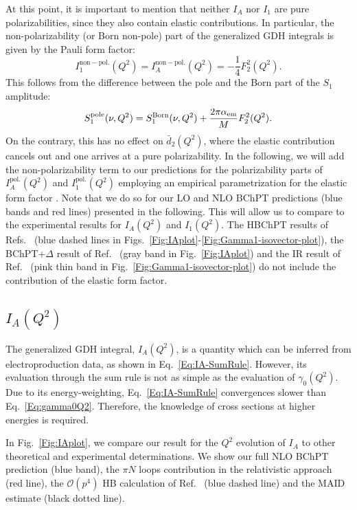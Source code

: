 \documentclass[twocolumn,prc,showpacs,nofootinbib,preprintnumbers,amsmath,amssymb,superscriptaddress]{revtex4-1}
\def\beq{\begin{equation}}
\def\eeq{\end{equation}}
\def\eqlab#1{\label{eq:#1}}
\begin{document}
At this point, it is important to mention that neither $I_A$ nor $I_1$ are pure polarizabilities, since they also contain elastic contributions. 
In particular, the non-polarizability (or Born non-pole) part of the generalized GDH integrals is given by the Pauli form factor:
\beq
I_1^\mathrm{non-pol.}(Q^2)=I_A^\mathrm{non-pol.}(Q^2)=-\frac{1}{4}F_2^2(Q^2).\eqlab{genGDHnonpole}
\eeq
This follows from the difference between the pole and the Born part of the $S_1$ amplitude:
\beq
S_1^{\mathrm{pole}}(\nu, Q^2)= S_1^{\mathrm{Born}}(\nu, Q^2) + \frac{2\pi \alpha_{\rm em}}{M}F_2^2(Q^2).\eqlab{S1poleBorn}
\eeq
On the contrary, this has no effect on $\bar{d}_2(Q^2)$, where the elastic contribution cancels out and one arrives at a pure polarizability.
In the following, we will add the non-polarizability term to our predictions for the polarizability parts of $I_A^\mathrm{pol.}(Q^2)$ and $I_1^\mathrm{pol.}(Q^2)$ employing an empirical parametrization for the elastic form factor \cite{Bradford:2006yz}. Note that we do so for our LO and NLO BChPT predictions (blue bands and red lines) presented in the following. This will allow us to compare to the experimental results for $I_A(Q^2)$ and $I_1(Q^2)$. The HBChPT results of Refs.~\cite{Kao:2002cp,Kao:2003jd} (blue dashed lines in Figs.~\ref{Fig:IAplot}-\ref{Fig:Gamma1-isovector-plot}), the BChPT+$\Delta$ result of Ref.~\cite{Bernard:2012hb} (gray band in Fig.~\ref{Fig:IAplot}) and the IR result of Ref.~\cite{Bernard:2002pw,Bernard:2002bs} (pink thin band in Fig.~\ref{Fig:Gamma1-isovector-plot}) do not include the contribution of the elastic form factor.



\subsection{$I_A(Q^2)$}

The generalized GDH integral, $I_A(Q^2)$, is a quantity which can be inferred from electroproduction data, as shown in Eq.~\eqref{Eq:IA-SumRule}. 
However, its evaluation through the sum rule is not as simple as the evaluation of $\gamma_0(Q^2)$. Due to its energy-weighting, Eq.~\eqref{Eq:IA-SumRule} convergences slower than Eq.~\eqref{Eq:gamma0Q2}. Therefore, the knowledge of cross sections at higher energies is required.


In Fig.~\ref{Fig:IAplot}, we compare our result for the $Q^2$ evolution of $I_A$ to other theoretical and experimental determinations. We show our full NLO BChPT prediction (blue band), the $\pi N$ loops contribution in the relativistic approach (red line), the $\mathcal{O}(p^4)$ HB calculation of Ref.~\cite{Kao:2003jd} (blue dashed line) and the MAID estimate \cite{MAID} (black dotted line). 
\end{document}
